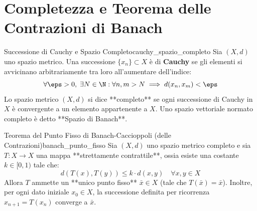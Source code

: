\section{Completezza e Teorema delle Contrazioni di Banach}
\label{sec:completezza_banach}

\begin{definizione}{Successione di Cauchy e Spazio Completo}{cauchy_spazio_completo}
Sia $(X, d)$ uno spazio metrico. Una successione $\{x_n\} \subset X$ è di \textbf{Cauchy} se gli elementi si avvicinano arbitrariamente tra loro all'aumentare dell'indice:
\[
    \forall \eps > 0, \; \exists N \in \N : \forall n, m > N \implies d(x_n, x_m) < \eps
\]
Lo spazio metrico $(X, d)$ si dice **completo** se ogni successione di Cauchy in $X$ è convergente a un elemento appartenente a $X$. Uno spazio vettoriale normato completo è detto **Spazio di Banach**.
\end{definizione}

\begin{teorema}{Teorema del Punto Fisso di Banach-Caccioppoli (delle Contrazioni)}{banach_punto_fisso}
Sia $(X, d)$ uno spazio metrico completo e sia $T \colon X \to X$ una mappa **strettamente contrattile**, ossia esiste una costante $k \in [0, 1)$ tale che:
\[
    d(T(x), T(y)) \le k \cdot d(x, y) \quad \forall x, y \in X
\]
Allora $T$ ammette un **unico punto fisso** $\bar{x} \in X$ (tale che $T(\bar{x}) = \bar{x}$). Inoltre, per ogni dato iniziale $x_0 \in X$, la successione definita per ricorrenza $x_{n+1} = T(x_n)$ converge a $\bar{x}$.
\end{teorema}
